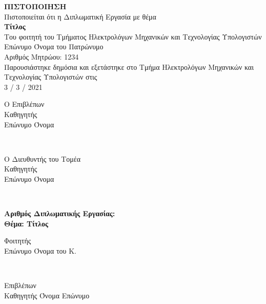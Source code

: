 \pagestyle{empty}

\begin{center}



{\Large \textbf{ΠΙΣΤΟΠΟΙΗΣΗ}} \\[1 cm]
Πιστοποιείται ότι η Διπλωματική Εργασία με θέμα \\[2 cm]

{\large \textbf{Τίτλος}} \\[2 cm]


Του φοιτητή του Τμήματος Ηλεκτρολόγων Μηχανικών και Τεχνολογίας Υπολογιστών \\[2 cm]


Επώνυμο Όνομα του Πατρώνυμο \\
Αριθμός Μητρώου: 1234 \\[2 cm]


Παρουσιάστηκε δημόσια και εξετάστηκε στο Τμήμα Ηλεκτρολόγων Μηχανικών και Τεχνολογίας Υπολογιστών στις \\
3 / 3 / 2021\\[2cm]

\begin{minipage}{0.45\textwidth}
\begin{flushleft} \center
Ο Επιβλέπων\\[1cm]
Καθηγητής\\
Επώνυμο Όνομα
\end{flushleft}
\end{minipage}
~
\begin{minipage}{0.45\textwidth}
\begin{flushright}  \center
Ο Διευθυντής του Τομέα \\[1cm]
Καθηγητής\\
Επώνυμο Όνομα\\
\end{flushright}
\end{minipage}\\[2cm]

\end{center}
\newpage \thispagestyle{empty} \mbox{}
\newpage
{\large \textbf{Αριθμός Διπλωματικής Εργασίας:} \\[2cm]
\textbf{Θέμα: Τίτλος} } \\[2cm]

\begin{minipage}{0.5\textwidth}
\begin{flushleft} \center
Φοιτητής\\[1cm]
Επώνυμο Όνομα του Κ.\\	
\end{flushleft}
\end{minipage}
~
\begin{minipage}{0.5\textwidth}
\begin{flushright}  \center
Επιβλέπων\\[1cm]
Καθηγητής Όνομα Επώνυμο\\
\end{flushright}
\end{minipage}\\[2cm]

\newpage \thispagestyle{empty} \mbox{}